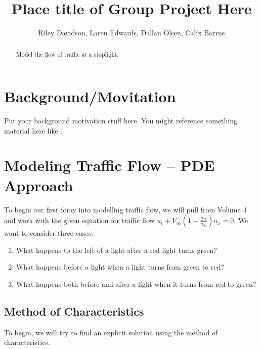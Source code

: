 \documentclass[12pt]{article}
\begin{document}
	
	\title{Place title of Group Project Here}
	\author{Riley Davidson, Laren Edwards, Dallan Olsen, Calix Barrus}
	
	\date{}
	
	\maketitle
	
	\begin{abstract}
		Model the flow of traffic at a stoplight. 
	\end{abstract}
	
	\section{Background/Movitation}
	Put your background motivation stuff here. You might reference something material here like \cite{ref1}.
	
	\section{Modeling Traffic Flow – PDE Approach}
	
	To begin our first foray into modelling traffic flow, we will pull from Volume 4 and work with the given equation for traffic flow $u_t + V_\infty \left(1 - \frac{2u}{u_{\infty}} \right) u_x = 0$. We want to consider three cases:
	\begin{enumerate}
		\item What happens to the left of a light after a red light turns green?
		\item What happens before a light when a light turns from green to red? 
		\item What happens both before and after a light when it turns from red to green?
	\end{enumerate}
	
	\subsection{Method of Characteristics} 
	To begin, we will try to find an explicit solution using the method of characteristics. 
	
\end{document}
